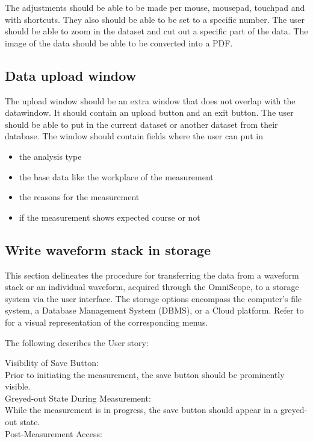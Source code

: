 \documentclass{scrreprt}
\begin{document}
The adjustments should be able to be made per mouse, mousepad, touchpad and with shortcuts. They also should be able to be set to a specific number. 
The user should be able to zoom in the dataset and cut out a specific part of the data. The image of the data should be able to be converted into a PDF. 

\subsection{Data upload window}

The upload window should be an extra window that does not overlap with the datawindow. It should contain an upload button and an exit button. The user should be able to put in the 
current dataset or another dataset from their database. 
The window should contain fields where the user can put in 
\begin{itemize}
    \item the analysis type
    \item the base data like the workplace of the measurement
    \item the reasons for the measurement
    \item if the measurement shows expected course or not 
\end{itemize}

\subsection{Write waveform stack in storage}

This section delineates the procedure for transferring the data from a waveform stack or an individual waveform, acquired through the OmniScope, 
to a storage system via the user interface. The storage options encompass the computer's file system, 
a Database Management System (DBMS), or a Cloud platform. Refer to \cite{fig:saveData} for a visual representation of the corresponding menus.

The following describes the User story: 

Visibility of Save Button: \\

Prior to initiating the measurement, the save button should be prominently visible.\\
Greyed-out State During Measurement:\\

While the measurement is in progress, the save button should appear in a greyed-out state.\\
Post-Measurement Access:\\
\end{document}
